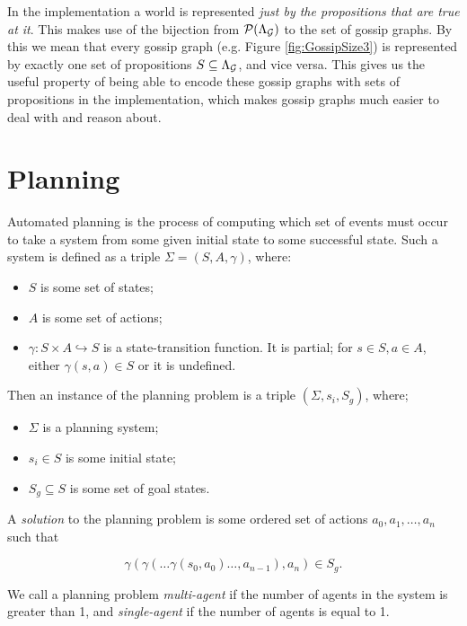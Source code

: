 \documentclass[ %
                    author={Leo Poulson},
                supervisor={Dr. Steven Ramsay},
                    degree={BSc},
                     title={Epistemic Planning for the Dynamic Gossip problem},
                  subtitle={},
                      year={2019} ]{dissertation}
\begin{document}
In the implementation a world is represented \emph{just by the propositions that
  are true at it}. This makes use of the bijection from
$\mathcal{P}(\Lambda_{\mathcal{G}})$ to the set of gossip graphs. By this we mean that
every gossip graph (e.g. Figure \ref{fig:GossipSize3}) is represented by exactly
one set of propositions $S \subseteq \Lambda_{\mathcal{G}}$, and vice versa. This
gives us the useful property of being able to encode these gossip graphs with
sets of propositions in the implementation, which makes gossip graphs much easier to
deal with and reason about.

\section{Planning}
\label{sec:Planning}

Automated planning is the process of computing which set of events must occur to
take a system from some given initial state to some successful state. Such a
system is defined as a triple $\Sigma = (S, A, \gamma)$, where:

\begin{itemize}
\item $S$ is some set of states;
\item $A$ is some set of actions;
\item $\gamma : S \times A \hookrightarrow S$ is a state-transition function. It
  is partial; for $s \in S, a \in A$, either $\gamma(s, a) \in S$ or it is
  undefined. 
\end{itemize}

Then an instance of the planning problem is a triple $(\Sigma, s_i, S_g)$,
where;

\begin{itemize}
\item $\Sigma$ is a planning system;
\item $s_i \in S$ is some initial state;
\item $S_g \subseteq S$ is some set of goal states.  
\end{itemize}

A \emph{solution} to the planning problem is some ordered set of actions
${a_0, a_1, \ldots, a_n}$ such that

\[\gamma(\gamma(\ldots \gamma(s_0, a_0) \ldots ,a_{n-1}) ,a_n) \in S_g. \]

We call a planning problem \emph{multi-agent} if the number of
agents in the system is greater than 1, and \emph{single-agent} if the number
of agents is equal to 1. 
\end{document}
